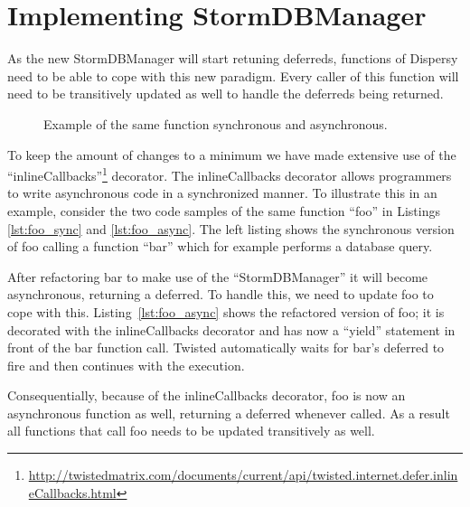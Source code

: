 \section{Implementing StormDBManager}
\label{sct:implementing_stormdbmanager}

As the new StormDBManager will start retuning deferreds, functions of Dispersy need to be able to cope with this new paradigm.
Every caller of this function will need to be transitively updated as well to handle the deferreds being returned.

\begin{figure}[h]
	\begin{subfigure}[b]{.5\linewidth}
		
	\end{subfigure}
	\begin{subfigure}[b]{.5\linewidth}
		
	\end{subfigure}
	\caption*{Example of the same function synchronous and asynchronous.}
\end{figure}

To keep the amount of changes to a minimum we have made extensive use of the \enquote{inlineCallbacks}\footnote{\url{http://twistedmatrix.com/documents/current/api/twisted.internet.defer.inlineCallbacks.html}} decorator.
The inlineCallbacks decorator allows programmers to write asynchronous code in a synchronized manner.
To illustrate this in an example, consider the two code samples of the same function \enquote{foo} in Listings \ref{lst:foo_sync} and \ref{lst:foo_async}.
The left listing shows the synchronous version of foo calling a function \enquote{bar} which for example performs a database query.

After refactoring bar to make use of the \enquote{StormDBManager} it will become asynchronous, returning a deferred.
To handle this, we need to update foo to cope with this.
Listing~\ref{lst:foo_async} shows the refactored version of foo; it is decorated with the inlineCallbacks decorator and has now a \enquote{yield} statement in front of the bar function call.
Twisted automatically waits for bar's deferred to fire and then continues with the execution.

Consequentially, because of the inlineCallbacks decorator, foo is now an asynchronous function as well, returning a deferred whenever called.
As a result all functions that call foo needs to be updated transitively as well.

